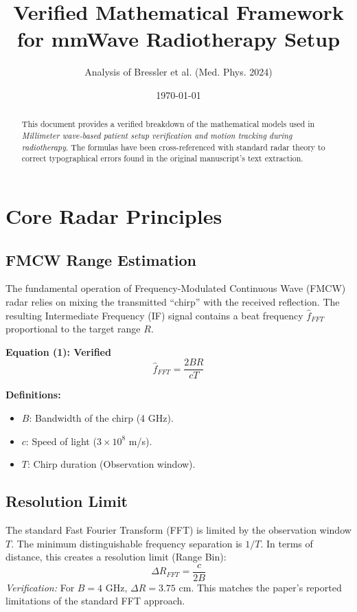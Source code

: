 \documentclass[11pt, a4paper]{article}
\title{\textbf{Verified Mathematical Framework for mmWave Radiotherapy Setup}}
\author{Analysis of Bressler et al. (Med. Phys. 2024)}
\date{\today}
\begin{document}
\maketitle

\begin{abstract}
    This document provides a verified breakdown of the mathematical models used in \textit{Millimeter wave-based patient setup verification and motion tracking during radiotherapy}. The formulas have been cross-referenced with standard radar theory to correct typographical errors found in the original manuscript's text extraction.
\end{abstract}

\section{Core Radar Principles}

\subsection{FMCW Range Estimation}
The fundamental operation of Frequency-Modulated Continuous Wave (FMCW) radar relies on mixing the transmitted ``chirp'' with the received reflection. The resulting Intermediate Frequency (IF) signal contains a beat frequency $\hat{f}_{FFT}$ proportional to the target range $R$.

\textbf{Equation (1): Verified}
\begin{equation}
    \hat{f}_{FFT} = \frac{2 B R}{c T}
    \label{eq:range}
\end{equation}

\noindent \textbf{Definitions:}
\begin{itemize}
    \item $B$: Bandwidth of the chirp (4 GHz).
    \item $c$: Speed of light ($3 \times 10^8$ m/s).
    \item $T$: Chirp duration (Observation window).
\end{itemize}

\subsection{Resolution Limit}
The standard Fast Fourier Transform (FFT) is limited by the observation window $T$. The minimum distinguishable frequency separation is $1/T$. In terms of distance, this creates a resolution limit (Range Bin):
\begin{equation}
    \Delta R_{FFT} = \frac{c}{2B}
\end{equation}
\textit{Verification:} For $B = 4$ GHz, $\Delta R = 3.75$ cm. This matches the paper's reported limitations of the standard FFT approach.
\end{document}
